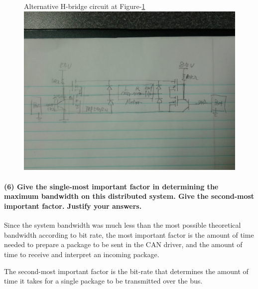 \documentclass[a4paper]{article}
\newlength{\pic}
\begin{document}
\setlength{\pic}{0.8\textwidth}
\begin{figure}[htp]
\noindent Alternative H-bridge circuit at Figure-\ref{hbridge}
\center
\includegraphics[width=\pic]{circuits/Alternate_H-bridge}
\caption{ }
\label{hbridge}
\end{figure}

\paragraph{(6) Give the single-most important factor in determining the maximum bandwidth on this distributed system.
Give the second-most important factor. Justify your answers.  \\ }

Since the system bandwidth was much less than the most possible theoretical bandwidth according to bit rate, the most important factor is the amount of time needed to prepare a package to be sent in the CAN driver, and the amount of time to receive and interpret an incoming package.

The second-most important factor is the bit-rate that determines the amount of time it takes for a single package to be transmitted over the bus.
\end{document}
